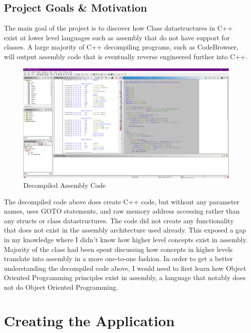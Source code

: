 \documentclass[twoside]{article}
\begin{document}
    \subsection{Project Goals \& Motivation}\label{subsec:project-goals}
    The main goal of the project is to discover how Class datastructures in C++ exist at lower level languages such as assembly that do not have support for classes.
    A large majority of C++ decompiling programs, such as CodeBrowser, will output assembly code that is eventually reverse engineered further into C++.
    \begin{figure}[hbtp]
        \centering
        \includegraphics[width=\textwidth]{DecompiledAssembly}
        \caption {Decompiled Assembly Code}
        \label{fig:DecompiledAssemblyImage}
    \end{figure}

    \bigbreak
    \noindent
    The decompiled code above does create C++ code, but without any parameter names, uses GOTO statements, and raw memory address accessing rather than any structs or class datastructures.
    The code did not create any functionality that does not exist in the assembly architecture used already.
    This exposed a gap in my knowledge where I didn't know how higher level concepts exist in assembly.
    Majority of the class had been spent discussing how concepts in higher levels translate into assembly in a more one-to-one fashion.
    In order to get a better understanding the decompiled code above, I would need to first learn how Object Oriented Programming principles exist in assembly, a language that notably does not do Object Oriented Programming.

    \section{Creating the Application}\label{sec:creating-the-application}
\end{document}
